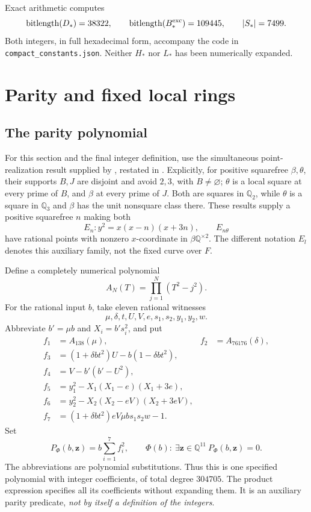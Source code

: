 \documentclass[11pt]{article}
\theoremstyle{definition}
\newcommand{\Q}{\mathbb Q}\newcommand{\Z}{\mathbb Z}
\begin{document}
Exact arithmetic computes
\[
 \operatorname{bitlength}(D_*)=38322,\qquad
 \operatorname{bitlength}(B_*^{\rm exc})=109445,
 \qquad |S_*|=7499.
\]
Both integers, in full hexadecimal form, accompany the code in
\texttt{compact\_constants.json}. Neither \(H_*\) nor \(L_*\)
has been numerically expanded. 

\section{Parity and fixed local rings}
\label{sec:parity}
\subsection{The parity polynomial}

For this section and the final integer definition, use the simultaneous
point-realization result supplied by \cite[Lemmas 3.4 and 3.6]{H10},
restated in \cite[Arithmetic Input 2.3]{Conant}. Explicitly, for positive squarefree \(\beta,\theta\),
their supports \(B,J\) are disjoint and avoid \(2,3\), with
\(B\ne\varnothing\); \(\theta\) is a local square at every
prime of \(B\), and \(\beta\) at every prime of \(J\).
Both are squares in \(\Q_2\), while \(\theta\) is a square
in \(\Q_3\) and \(\beta\) has the unit nonsquare class there.
These results supply a positive squarefree \(n\) making both
\[
 E_n:y^2=x(x-n)(x+3n),\qquad E_{n\theta}
\]
have rational points with nonzero \(x\)-coordinate in
\(\beta\Q^{\times2}\). The different notation \(E_l\) denotes
this auxiliary family, not the fixed curve over \(F\).

Define a completely numerical polynomial
\[
                  A_N(T)=\prod_{j=1}^N(T^2-j^2).
\]
For the rational input \(b\), take eleven rational witnesses
\[
                  \mu,\delta,t,U,V,e,s_1,s_2,y_1,y_2,w.
\]
Abbreviate \(b'=\mu b\) and \(X_i=b's_i^2\), and put
\begin{align*}
 f_1&=A_{138}(\mu),&f_2&=A_{76176}(\delta),\\
 f_3&=(1+\delta bt^2)U-b(1-\delta bt^2),\\
 f_4&=V-b'(b'-U^2),\\
 f_5&=y_1^2-X_1(X_1-e)(X_1+3e),\\
 f_6&=y_2^2-X_2(X_2-eV)(X_2+3eV),\\
 f_7&=(1+\delta bt^2)eV\mu b s_1s_2w-1.
\end{align*}
Set
\begin{equation}\label{eq:numerical-phi}
 P_\Phi(b,\mathbf z)=b\sum_{i=1}^7f_i^2,
 \qquad\Phi(b):\ \exists\mathbf z\in\Q^{11}\ P_\Phi(b,\mathbf z)=0.
\end{equation}
The abbreviations are polynomial substitutions. Thus this is one
specified polynomial with integer coefficients, of total degree
\(304705\). The product expression specifies all its coefficients
without expanding them. It is an auxiliary parity predicate,
\emph{not by itself a definition of the integers}.
\end{document}
